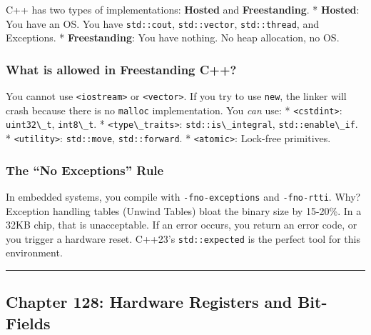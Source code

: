 C++ has two types of implementations: \textbf{Hosted} and
\textbf{Freestanding}. * \textbf{Hosted}: You have an OS. You have
\passthrough{\lstinline!std::cout!},
\passthrough{\lstinline!std::vector!},
\passthrough{\lstinline!std::thread!}, and Exceptions. *
\textbf{Freestanding}: You have nothing. No heap allocation, no OS.

\hypertarget{what-is-allowed-in-freestanding-c}{%
\subsubsection{What is allowed in Freestanding
C++?}\label{what-is-allowed-in-freestanding-c}}

You cannot use \passthrough{\lstinline!<iostream>!} or
\passthrough{\lstinline!<vector>!}. If you try to use
\passthrough{\lstinline!new!}, the linker will crash because there is no
\passthrough{\lstinline!malloc!} implementation. You \emph{can} use: *
\passthrough{\lstinline!<cstdint>!}:
\passthrough{\lstinline!uint32\_t!}, \passthrough{\lstinline!int8\_t!}.
* \passthrough{\lstinline!<type\_traits>!}:
\passthrough{\lstinline!std::is\_integral!},
\passthrough{\lstinline!std::enable\_if!}. *
\passthrough{\lstinline!<utility>!}:
\passthrough{\lstinline!std::move!},
\passthrough{\lstinline!std::forward!}. *
\passthrough{\lstinline!<atomic>!}: Lock-free primitives.

\hypertarget{the-no-exceptions-rule}{%
\subsubsection{The ``No Exceptions''
Rule}\label{the-no-exceptions-rule}}

In embedded systems, you compile with
\passthrough{\lstinline!-fno-exceptions!} and
\passthrough{\lstinline!-fno-rtti!}. Why? Exception handling tables
(Unwind Tables) bloat the binary size by 15-20\%. In a 32KB chip, that
is unacceptable. If an error occurs, you return an error code, or you
trigger a hardware reset. C++23's
\passthrough{\lstinline!std::expected!} is the perfect tool for this
environment.

\begin{center}\rule{0.5\linewidth}{0.5pt}\end{center}

\hypertarget{chapter-128-hardware-registers-and-bit-fields}{%
\subsection{Chapter 128: Hardware Registers and
Bit-Fields}\label{chapter-128-hardware-registers-and-bit-fields}}

